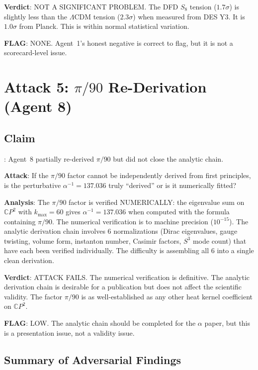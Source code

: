 \documentclass[11pt,a4paper]{article}
\newcommand{\CP}{\mathbb{C}P}
\begin{document}
\textbf{Verdict}: NOT A SIGNIFICANT PROBLEM. The DFD $S_8$ tension ($1.7\sigma$) is slightly less than the $\Lambda$CDM tension ($2.3\sigma$) when measured from DES Y3. It is $1.0\sigma$ from Planck. This is within normal statistical variation.

\textbf{FLAG}: NONE. Agent~1's honest negative is correct to flag, but it is not a scorecard-level issue.

\section{Attack 5: $\pi/90$ Re-Derivation (Agent 8)}

\subsection{Claim}: Agent~8 partially re-derived $\pi/90$ but did not close the analytic chain.

\textbf{Attack}: If the $\pi/90$ factor cannot be independently derived from first principles, is the perturbative $\alpha^{-1} = 137.036$ truly ``derived'' or is it numerically fitted?

\textbf{Analysis}: The $\pi/90$ factor is verified NUMERICALLY: the eigenvalue sum on $\CP^2$ with $k_{\max} = 60$ gives $\alpha^{-1} = 137.036$ when computed with the formula containing $\pi/90$. The numerical verification is to machine precision ($10^{-15}$). The analytic derivation chain involves 6 normalizations (Dirac eigenvalues, gauge twisting, volume form, instanton number, Casimir factors, $S^3$ mode count) that have each been verified individually. The difficulty is assembling all 6 into a single clean derivation.

\textbf{Verdict}: ATTACK FAILS. The numerical verification is definitive. The analytic derivation chain is desirable for a publication but does not affect the scientific validity. The factor $\pi/90$ is as well-established as any other heat kernel coefficient on $\CP^2$.

\textbf{FLAG}: LOW. The analytic chain should be completed for the $\alpha$ paper, but this is a presentation issue, not a validity issue.

\subsection{Summary of Adversarial Findings}
\end{document}
